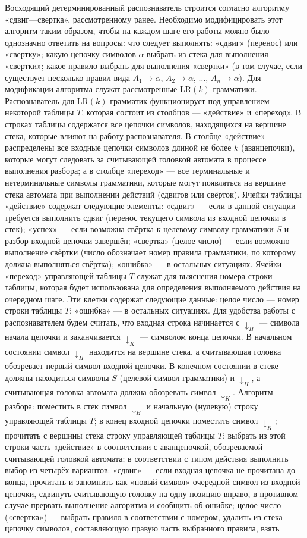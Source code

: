 \documentclass[a4paper,12pt]{article}
\begin{document}
Восходящий детерминированный распознаватель строится согласно алгоритму «сдвиг—свертка», рассмотренному ранее. Необходимо модифицировать этот алгоритм таким образом, чтобы на каждом шаге его работы можно было однозначно ответить на вопросы: что следует выполнять: «сдвиг» (перенос) или «свертку»; какую цепочку символов \(\alpha\) выбрать из стека для выполнения «свертки»; какое правило выбрать для выполнения «свертки» (в том случае, если существует несколько правил вида \(A_1\to\alpha\), \(A_2\to\alpha\), \(\ldots\), \(A_n\to\alpha\)). Для модификации алгоритма служат рассмотренные \(\mathrm{LR}(k)\)-грамматики. Распознаватель для \(\mathrm{LR}(k)\)-грамматик функционирует под управлением некоторой таблицы \(T\), которая состоит из столбцов — «действие» и «переход». В строках таблицы содержатся все цепочки символов, находящихся на вершине стека, которые влияют на работу распознавателя. В столбце «действие» распределены все входные цепочки символов длиной не более \(k\) (аванцепочки), которые могут следовать за считывающей головкой автомата в процессе выполнения разбора; а в столбце «переход» — все терминальные и нетерминальные символы грамматики, которые могут появляться на вершине стека автомата при выполнении действий (сдвигов или свёрток). Ячейки таблицы «действие» содержат следующие элементы: «сдвиг» — если в данной ситуации требуется выполнить сдвиг (перенос текущего символа из входной цепочки в стек); «успех» — если возможна свёртка к целевому символу грамматики \(S\) и разбор входной цепочки завершён; «свертка» (целое число) — если возможно выполнение свёртки (число обозначает номер правила грамматики, по которому должна выполняться свёртка); «ошибка» — в остальных ситуациях. Ячейки «переход» управляющей таблицы \(T\) служат для выяснения номера строки таблицы, которая будет использована для определения выполняемого действия на очередном шаге. Эти клетки содержат следующие данные: целое число — номер строки таблицы \(T\); «ошибка» — в остальных ситуациях. Для удобства работы с распознавателем будем считать, что входная строка начинается с \(\downarrow_H\) — символа начала цепочки и заканчивается \(\downarrow_K\) — символом конца цепочки. В начальном состоянии символ \(\downarrow_H\) находится на вершине стека, а считывающая головка обозревает первый символ входной цепочки. В конечном состоянии в стеке должны находиться символы \(S\) (целевой символ грамматики) и \(\downarrow_H\), а считывающая головка автомата должна обозревать символ \(\downarrow_K\). Алгоритм разбора: поместить в стек символ \(\downarrow_H\) и начальную (нулевую) строку управляющей таблицы \(T\); в конец входной цепочки поместить символ \(\downarrow_K\); прочитать с вершины стека строку управляющей таблицы \(T\); выбрать из этой строки часть «действие» в соответствии с аванцепочкой, обозреваемой считывающей головкой автомата; в соответствии с типом действия выполнить выбор из четырёх вариантов: «сдвиг» — если входная цепочка не прочитана до конца, прочитать и запомнить как «новый символ» очередной символ из входной цепочки, сдвинуть считывающую головку на одну позицию вправо, в противном случае прервать выполнение алгоритма и сообщить об ошибке; целое число («свертка») — выбрать правило в соответствии с номером, удалить из стека цепочку символов, составляющую правую часть выбранного правила, взять 
\end{document}
